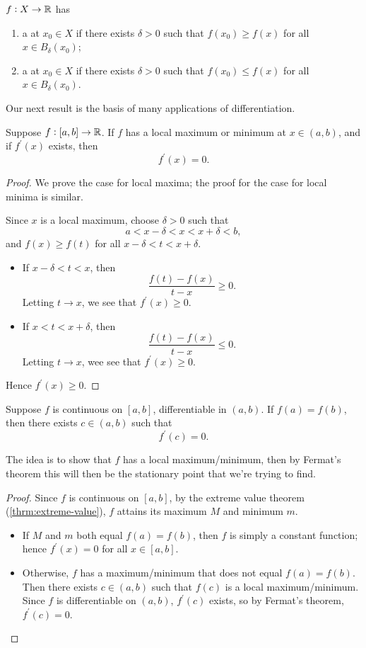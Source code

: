 \begin{definition}
$f:X\to\mathbb R$ has
\begin{enumerate}[label=(\roman*)]
\item a  at $x_0\in X$ if there exists $\delta>0$ such that $f(x_0)\ge f(x)$ for all $x\in B_\delta(x_0)$;
\item a  at $x_0\in X$ if there exists $\delta>0$ such that $f(x_0)\le f(x)$ for all $x\in B_\delta(x_0)$.
\end{enumerate}
\end{definition}

Our next result is the basis of many applications of differentiation. 

\begin{lemma}
Suppose $f:[a,b]\to\mathbb R$. If $f$ has a local maximum or minimum at $x\in(a,b)$, and if $f^\prime(x)$ exists, then
\[f^\prime(x)=0.\]
\end{lemma}

\begin{proof}
We prove the case for local maxima; the proof for the case for local minima is similar.

Since $x$ is a local maximum, choose $\delta>0$ such that
\[a<x-\delta<x<x+\delta<b,\]
and $f(x)\ge f(t)$ for all $x-\delta<t<x+\delta$. 
\begin{itemize}
\item If $x-\delta<t<x$, then
\[\frac{f(t)-f(x)}{t-x}\ge0.\]
Letting $t\to x$, we see that $f^\prime(x)\ge0$.
\item If $x<t<x+\delta$, then
\[\frac{f(t)-f(x)}{t-x}\le0.\]
Letting $t\to x$, wee see that $f^\prime(x)\ge0$.
\end{itemize}
Hence $f^\prime(x)\ge0$.
\end{proof}

\begin{theorem}\label{thrm:rolle}
Suppose $f$ is continuous on $[a,b]$, differentiable in $(a,b)$. If $f(a)=f(b)$, then there exists $c\in(a,b)$ such that 
\[f^\prime(c)=0.\]
\end{theorem}

The idea is to show that $f$ has a local maximum/minimum, then by Fermat's theorem this will then be the stationary point that we're trying to find.

\begin{proof}
Since $f$ is continuous on $[a,b]$, by the extreme value theorem (\cref{thrm:extreme-value}), $f$ attains its maximum $M$ and minimum $m$.
\begin{itemize}
\item If $M$ and $m$ both equal $f(a)=f(b)$, then $f$ is simply a constant function; hence $f^\prime(x)=0$ for all $x\in[a,b]$.

\item Otherwise, $f$ has a maximum/minimum that does not equal $f(a)=f(b)$. Then there exists $c\in(a,b)$ such that $f(c)$ is a local maximum/minimum. Since $f$ is differentiable on $(a,b)$, $f^\prime(c)$ exists, so by Fermat's theorem, $f^\prime(c)=0$.
\end{itemize}
\end{proof}

